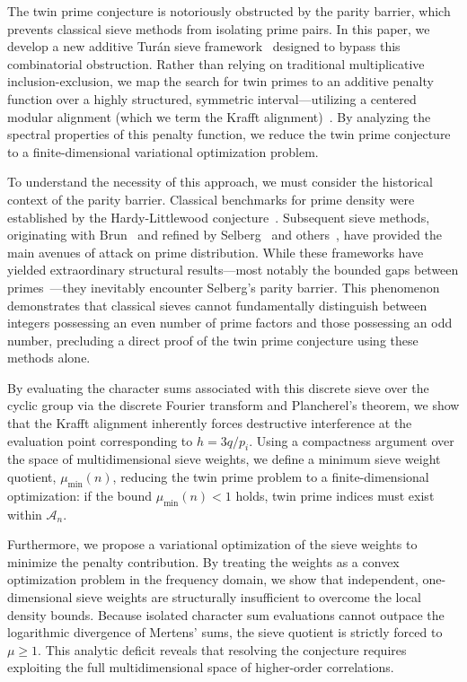 \documentclass[reqno,notitlepage]{amsart}
\begin{document}
The twin prime conjecture is notoriously obstructed by the parity barrier, which prevents classical
sieve methods from isolating prime pairs. In this paper, we develop a new additive Turán sieve
framework~\cite{Turan1934} designed to bypass this combinatorial obstruction. Rather than relying on
traditional multiplicative inclusion-exclusion, we map the search for twin primes to an additive
penalty function over a highly structured, symmetric interval---utilizing a centered modular
alignment (which we term the Krafft alignment)~\cite{Krafft1801,Portela2026}. By analyzing the spectral
properties of this penalty function, we reduce the twin prime conjecture to a
finite-dimensional variational optimization problem.

To understand the necessity of this approach, we must consider the historical context of the parity
barrier. Classical benchmarks for prime density were established by the Hardy-Littlewood
conjecture~\cite{HardyLittlewood1923}. Subsequent sieve methods, originating with
Brun~\cite{Brun1919} and refined by Selberg~\cite{Selberg1947} and
others~\cite{MontgomeryVaughan2006}, have provided the main avenues of attack on prime distribution.
While these frameworks have yielded extraordinary structural results---most notably the bounded gaps
between primes~\cite{GPY2009,Maynard2015,Polymath8a,Polymath8b}---they inevitably encounter
Selberg's parity barrier. This phenomenon demonstrates that classical sieves cannot fundamentally
distinguish between integers possessing an even number of prime factors and those possessing an odd
number, precluding a direct proof of the twin prime conjecture using these methods alone.

By evaluating the character sums associated with this discrete sieve over the cyclic group via the
discrete Fourier transform and Plancherel's theorem, we show that the Krafft alignment inherently
forces destructive interference at the evaluation point corresponding to $h = 3q/p_i$.
Using a compactness argument over the space of multidimensional sieve weights, we define a minimum
sieve weight quotient, $\mu_{\min}(n)$, reducing the twin prime problem to a
finite-dimensional optimization: if the bound $\mu_{\min}(n) < 1$ holds, twin prime indices must
exist within $\mathcal{A}_n$.

Furthermore, we propose a variational optimization of the sieve weights to minimize the penalty
contribution. By treating the weights as a convex optimization problem in the frequency domain, we
show that independent, one-dimensional sieve weights are structurally insufficient to overcome the
local density bounds. Because isolated character sum evaluations cannot outpace the logarithmic
divergence of Mertens' sums, the sieve quotient is strictly forced to $\mu \ge 1$. This analytic
deficit reveals that resolving the conjecture requires exploiting the full multidimensional
space of higher-order correlations.
\end{document}
